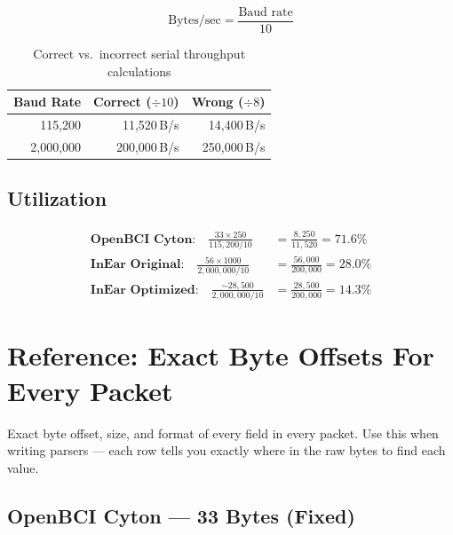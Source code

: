 \documentclass[11pt,a4paper]{article}
\begin{document}
\[
\text{Bytes/sec} = \frac{\text{Baud rate}}{10}
\]

\begin{table}[H]
\centering
\begin{tabular}{|r|r|r|}
\hline
\textbf{Baud Rate} & \textbf{Correct ($\div 10$)} & \textbf{Wrong ($\div 8$)} \\\hline
115,200 & 11,520\,B/s & 14,400\,B/s \\
2,000,000 & 200,000\,B/s & 250,000\,B/s \\
\hline
\end{tabular}
\caption{Correct vs.\ incorrect serial throughput calculations}
\end{table}

\subsection{Utilization}

\begin{align}
\textbf{OpenBCI Cyton:} \quad \frac{33 \times 250}{115{,}200 / 10} &= \frac{8{,}250}{11{,}520} = \mathbf{71.6\%} \\[0.5em]
\textbf{InEar Original:} \quad \frac{56 \times 1000}{2{,}000{,}000 / 10} &= \frac{56{,}000}{200{,}000} = \mathbf{28.0\%} \\[0.5em]
\textbf{InEar Optimized:} \quad \frac{{\sim}28{,}500}{2{,}000{,}000 / 10} &= \frac{28{,}500}{200{,}000} = \mathbf{14.3\%}
\end{align}

\newpage
\section{Reference: Exact Byte Offsets For Every Packet}
\label{sec:appendix-byte-offsets}

Exact byte offset, size, and format of every field in every packet. Use this when writing parsers --- each row tells you exactly where in the raw bytes to find each value.

\subsection{OpenBCI Cyton --- 33 Bytes (Fixed)}
\end{document}
